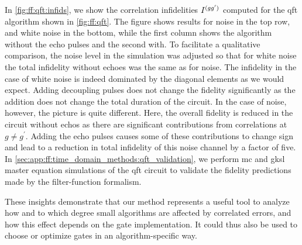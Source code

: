 In \cref{fig:ff:qft:infids}, we show the correlation infidelities $I^{(gg^{\prime})}$ computed for the \gls{qft} algorithm shown in \cref{fig:ff:qft}.
The figure shows results for \oneoverf noise in the top row, and white noise in the bottom, while the first column shows the algorithm without the echo pulses and the second with.
To facilitate a qualitative comparison, the noise level in the simulation was adjusted so that for white noise the total infidelity without echoes was the same as for \oneoverf noise.
The infidelity in the case of white noise is indeed dominated by the diagonal elements as we would expect.
Adding decoupling pulses does not change the fidelity significantly as the addition does not change the total duration of the circuit.
In the case of \oneoverf noise, however, the picture is quite different.
Here, the overall fidelity is reduced in the circuit without echos as there are significant contributions from correlations at $g\neq g^{\prime}$.
Adding the echo pulses causes some of these contributions to change sign and lead to a reduction in total infidelity of this noise channel by a factor of five.
In \cref{sec:app:ff:time_domain_methods:qft_validation}, we perform \gls{mc} and \gls{gksl} master equation simulations of the \gls{qft} circuit to validate the fidelity predictions made by the filter-function formalism.

These insights demonstrate that our method represents a useful tool to analyze how and to which degree small algorithms are affected by correlated errors, and how this effect depends on the gate implementation.
It could thus also be used to choose or optimize gates in an algorithm-specific way.
